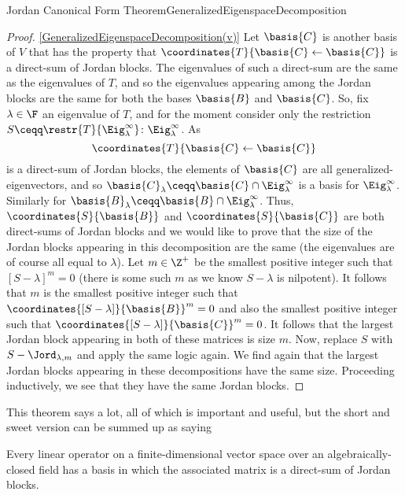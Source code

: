 \begin{thm}{Jordan Canonical Form Theorem}{GeneralizedEigenspaceDecomposition}
\begin{proof}
		\blni
		\cref{GeneralizedEigenspaceDecomposition(v)} Let $\basis{C}$ is another basis of $V$ that has the property that $\coordinates{T}{\basis{C}\leftarrow \basis{C}}$ is a direct-sum of Jordan blocks.  The eigenvalues of such a direct-sum are the same as the eigenvalues of $T$, and so the eigenvalues appearing among the Jordan blocks are the same for both the bases $\basis{B}$ and $\basis{C}$.  So, fix $\lambda \in \F$ an eigenvalue of $T$, and for the moment consider only the restriction $S\ceqq \restr{T}{\Eig _{\lambda}^{\infty}}\colon \Eig _{\lambda}^{\infty}$.  As $$\coordinates{T}{\basis{C}\leftarrow \basis{C}}$$ is a direct-sum of Jordan blocks, the elements of $\basis{C}$ are all generalized-eigenvectors, and so $\basis{C}_{\lambda}\ceqq \basis{C}\cap \Eig _{\lambda}^{\infty}$ is a basis for $\Eig _{\lambda}^{\infty}$.  Similarly for $\basis{B}_{\lambda}\ceqq \basis{B}\cap \Eig _{\lambda}^{\infty}$.  Thus, $\coordinates{S}{\basis{B}}$ and $\coordinates{S}{\basis{C}}$ are both direct-sums of Jordan blocks and we would like to prove that the size of the Jordan blocks appearing in this decomposition are the same (the eigenvalues are of course all equal to $\lambda$).  Let $m\in \Z ^+$ be the smallest positive integer such that $[S-\lambda ]^m=0$ (there is some such $m$ as we know $S-\lambda$ is nilpotent).  It follows that $m$ is the smallest positive integer such that $\coordinates{[S-\lambda ]}{\basis{B}}^m=0$ and also the smallest positive integer such that $\coordinates{[S-\lambda ]}{\basis{C}}^m=0$.  It follows that the largest Jordan block appearing in both of these matrices is size $m$.  Now, replace $S$ with $S-\Jord _{\lambda ,m}$ and apply the same logic again.  We find again that the largest Jordan blocks appearing in these decompositions have the same size.  Proceeding inductively, we see that they have the same Jordan blocks.
	\end{proof}
\end{thm}
This theorem says a lot, all of which is important and useful, but the short and sweet version can be summed up as saying
\begin{displayquote}
	Every linear operator on a finite-dimensional vector space over an algebraically-closed field has a basis in which the associated matrix is a direct-sum of Jordan blocks.
\end{displayquote}

